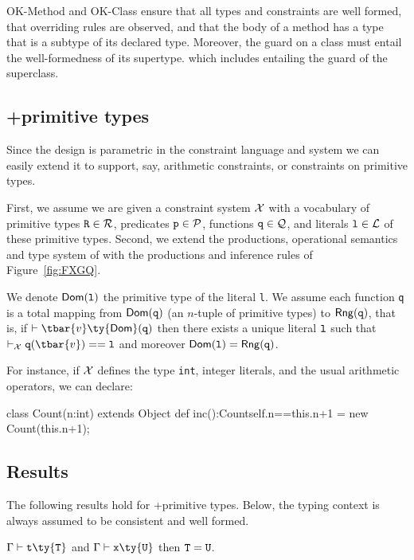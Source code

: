 {\sc OK-Method} and {\sc OK-Class} ensure that all types and constraints are well formed, that overriding rules are observed, and that the body of a method has a type that is a subtype of its declared type. Moreover, the guard on a class must entail the well-formedness of its supertype. which includes entailing the guard of the superclass.


\subsection{\FXG+primitive types}\label{sec:Q}

Since the \FXG design is parametric in the constraint language and system we can easily extend it to support, say, arithmetic constraints, or constraints on primitive types.

First, we assume we are given a constraint system $\cal X$ with a vocabulary of primitive types ${\tt R}\in\cal R$, predicates ${\tt p}\in\cal P$, functions ${\tt q}\in\cal Q$, and literals ${\tt l}\in\cal L$ of these primitive types. Second, we extend the productions, operational semantics and type system of \FXG with the productions and inference rules of Figure~\ref{fig:FXGQ}.

We denote $\Dom({\tt l})$ the primitive type of the literal {\tt l}. We assume each function {\tt q}
is a total mapping from ${\sf Dom}({\tt q})$ (an $n$-tuple of primitive types) to $\Img({\tt q})$, that is, if $\vdash \tbar{v}\ty{\sf Dom}({\tt q})$ then there exists a unique literal $\tt l$ such that $\vdashQ {\tt q}(\tbar{v})=={\tt l}$ and moreover $\Dom({\tt l})=\Img({\tt q})$.

For instance, if $\cal X$ defines the type {\tt int}, integer literals, and the usual arithmetic operators, we can declare:

\begin{xten}
class Count(n:int) extends Object {
  def inc():Count{self.n==this.n+1} =
  	new Count(this.n+1);
}
\end{xten}


\subsection{Results}
\label{sec:results}
The following results hold for \FXG+primitive types. Below, the typing context is always assumed to be consistent and well formed.


\begin{theorem}
$\Gamma\vdash {\tt t}\ty{\tt T}$ and $\Gamma\vdash {\tt x}\ty{\tt U}$ then ${\tt T}={\tt U}$.
\end{theorem}

